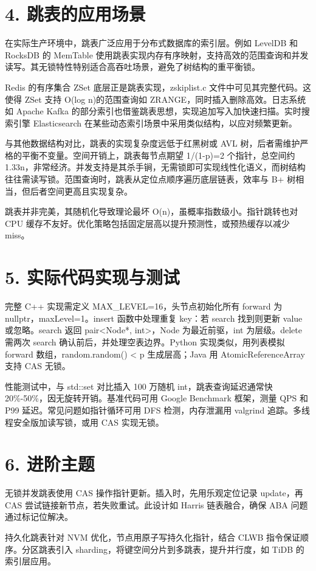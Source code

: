 \chapter{4. 跳表的应用场景}
在实际生产环境中，跳表广泛应用于分布式数据库的索引层。例如 LevelDB 和 RocksDB 的 MemTable 使用跳表实现内存有序映射，支持高效的范围查询和并发读写。其无锁特性特别适合高吞吐场景，避免了树结构的重平衡锁。\par
Redis 的有序集合 ZSet 底层正是跳表实现，zskiplist.c 文件中可见其完整代码。这使得 ZSet 支持 O(log n)的范围查询如 ZRANGE，同时插入删除高效。日志系统如 Apache Kafka 的部分索引也借鉴跳表思想，实现追加写入加快速扫描。实时搜索引擎 Elasticsearch 在某些动态索引场景中采用类似结构，以应对频繁更新。\par
与其他数据结构对比，跳表的实现复杂度远低于红黑树或 AVL 树，后者需维护严格的平衡不变量。空间开销上，跳表每节点期望 1/(1-p)=2 个指针，总空间约 1.33n，非常经济。并发支持是其杀手锏，无需锁即可实现线性化语义，而树结构往往需读写锁。范围查询时，跳表从定位点顺序遍历底层链表，效率与 B+ 树相当，但后者空间更高且实现复杂。\par
跳表并非完美，其随机化导致理论最坏 O(n)，虽概率指数级小。指针跳转也对 CPU 缓存不友好。优化策略包括固定层高以提升预测性，或预热缓存以减少 miss。\par
\chapter{5. 实际代码实现与测试}
完整 C++ 实现需定义 MAX\_{}LEVEL=16，头节点初始化所有 forward 为 nullptr，maxLevel=1。insert 函数中处理重复 key：若 search 找到则更新 value 或忽略。search 返回 pair<Node*, int>，Node 为最近前驱，int 为层级。delete 需两次 search 确认前后，并处理空表边界。Python 实现类似，用列表模拟 forward 数组，random.random() < p 生成层高；Java 用 AtomicReferenceArray 支持 CAS 无锁。\par
性能测试中，与 std::set 对比插入 100 万随机 int，跳表查询延迟通常快 20\%{}-50\%{}，因无旋转开销。基准代码可用 Google Benchmark 框架，测量 QPS 和 P99 延迟。常见问题如指针循环可用 DFS 检测，内存泄漏用 valgrind 追踪。多线程安全版加读写锁，或用 CAS 实现无锁。\par
\chapter{6. 进阶主题}
无锁并发跳表使用 CAS 操作指针更新。插入时，先用乐观定位记录 update，再 CAS 尝试链接新节点，若失败重试。此设计如 Harris 链表融合，确保 ABA 问题通过标记位解决。\par
持久化跳表针对 NVM 优化，节点用原子写持久化指针，结合 CLWB 指令保证顺序。分区跳表引入 sharding，将键空间分片到多跳表，提升并行度，如 TiDB 的索引层应用。\par
